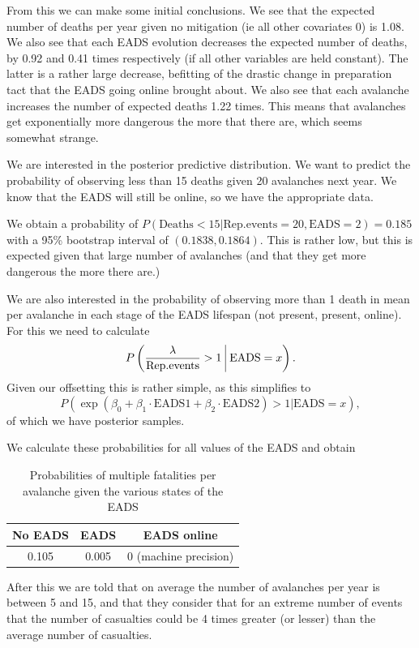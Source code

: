 \documentclass[10pt]{extarticle}
\begin{document}
From this we can make some initial conclusions. We see that the expected number of deaths per year given no mitigation (ie all other covariates 0) is 1.08. We also see that each EADS evolution decreases the expected number of deaths, by 0.92 and 0.41 times respectively (if all other variables are held constant). The latter is a rather large decrease, befitting of the drastic change in preparation tact that the EADS going online brought about. We also see that each avalanche increases the number of expected deaths 1.22 times. This means that avalanches get exponentially more dangerous the more that there are, which seems somewhat strange.

We are interested in the posterior predictive distribution. We want to predict the probability of observing less than 15 deaths given 20 avalanches next year. We know that the EADS will still be online, so we have the appropriate data. 

We obtain a probability of $P(\mathrm{Deaths}<15|\mathrm{Rep.events}=20, \mathrm{EADS}=2) = 0.185$ with a 95\% bootstrap interval of $(0.1838, 0.1864)$. This is rather low, but this is expected given that large number of avalanches (and that they get more dangerous the more there are.)

We are also interested in the probability of observing more than 1 death in mean per avalanche in each stage of the EADS lifespan (not present, present, online). For this we need to calculate $$P\left(\frac{\lambda}{\mathrm{Rep.events}}>1 \ \vline \ \mathrm{EADS}=x\right).$$ Given our offsetting this is rather simple, as this simplifies to $$P\left(\exp(\beta_0 + \beta_1 \cdot \mathrm{EADS1} + \beta_2 \cdot \mathrm{EADS2}) > 1 | \mathrm{EADS} = x\right),$$
of which we have posterior samples.

We calculate these probabilities for all values of the EADS and obtain
\begin{table}[ht]
	\centering
\begin{tabular}{ccc}
	\hline
	No EADS & EADS & EADS online \\
	\hline
	0.105 & 0.005 & 0 (machine precision) \\
	\hline
\end{tabular}
\caption{Probabilities of multiple fatalities per avalanche given the various states of the EADS}
\label{tab:probmdpa}
\end{table}

After this we are told that on average the number of avalanches per year is between 5 and 15, and that they consider that for an extreme number of events that the number of casualties could be 4 times greater (or lesser) than the average number of casualties. 
\end{document}
